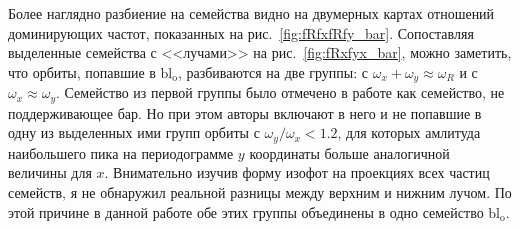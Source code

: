 \documentclass[tikz]{trlnotes}
\begin{document}
Более наглядно разбиение на семейства видно на двумерных картах отношений доминирующих частот, показанных на рис.~\ref{fig:fRfxfRfy_bar}. Сопоставляя выделенные семейства с <<лучами>> на рис.~\ref{fig:fRxfyx_bar}, можно заметить, что орбиты, попавшие в $\text{bl}_{\text{o}}$, разбиваются на две группы: с $ω_x + ω_y \approx ω_R$ и с $ω_x \approx ω_y$. Семейство из первой группы было отмечено в работе \cite{gajda2016} как семейство, не поддерживающее бар. Но при этом авторы включают в него и не попавшие в одну из выделенных ими групп орбиты с $ω_y/ω_x < 1.2$, для которых амлитуда наибольшего пика на периодограмме $y$ координаты больше аналогичной величины для $x$. Внимательно изучив форму изофот на проекциях всех частиц семейств, я не обнаружил реальной разницы между верхним и нижним лучом. По этой причине в данной работе обе этих группы объединены в одно семейство  $\text{bl}_\text{o}$.
\end{document}
